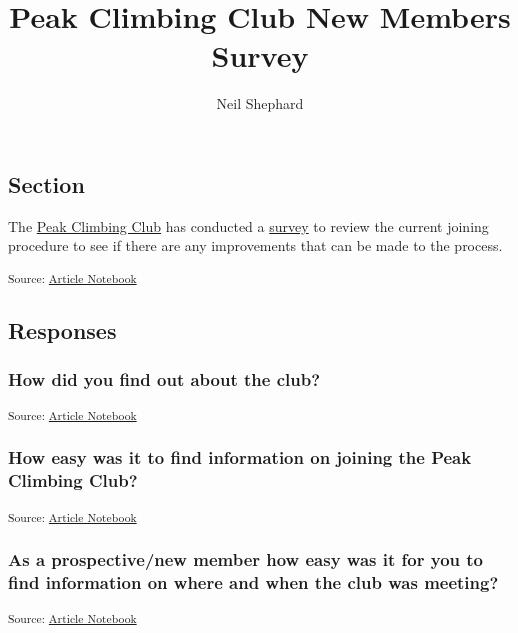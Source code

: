 \documentclass[
  letterpaper,
  DIV=11,
  numbers=noendperiod]{scrartcl}
\title{Peak Climbing Club New Members Survey}
\author{Neil Shephard}
\date{}
\begin{document}
\maketitle


\subsection{Section}\label{section}

The \href{https://www.peakclimbingclub.co.uk/}{Peak Climbing Club} has
conducted a \href{https://forms.gle/f5JWtnwqUiwh1hgg7}{survey} to review
the current joining procedure to see if there are any improvements that
can be made to the process.

\textsubscript{Source:
\href{https://slackline.github.io/pcc-new-member-survey/index.qmd.html}{Article
Notebook}}

\subsection{Responses}\label{responses}

\subsubsection{How did you find out about the
club?}\label{how-did-you-find-out-about-the-club}

\textsubscript{Source:
\href{https://slackline.github.io/pcc-new-member-survey/index.qmd.html}{Article
Notebook}}

\subsubsection{How easy was it to find information on joining the Peak
Climbing
Club?}\label{how-easy-was-it-to-find-information-on-joining-the-peak-climbing-club}

\textsubscript{Source:
\href{https://slackline.github.io/pcc-new-member-survey/index.qmd.html}{Article
Notebook}}

\subsubsection{As a prospective/new member how easy was it for you to
find information on where and when the club was
meeting?}\label{as-a-prospectivenew-member-how-easy-was-it-for-you-to-find-information-on-where-and-when-the-club-was-meeting}

\textsubscript{Source:
\href{https://slackline.github.io/pcc-new-member-survey/index.qmd.html}{Article
Notebook}}
\end{document}
